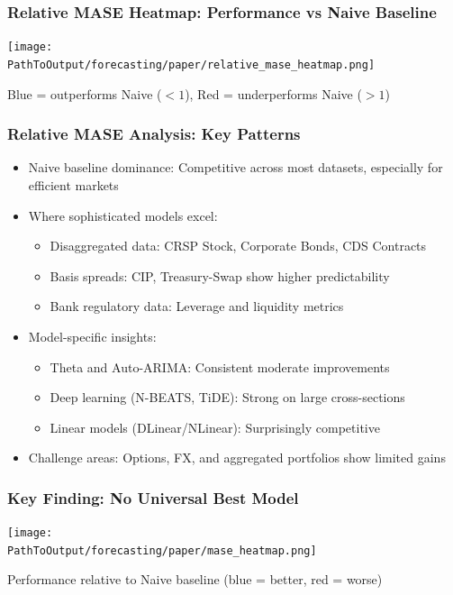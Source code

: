 \documentclass[ignorenonframetext, 9pt]{beamer}
\begin{document}
\begin{frame}
  \frametitle{Relative MASE Heatmap: Performance vs Naive Baseline}
  \centering
  \texttt{[image: \\PathToOutput/forecasting/paper/relative\_mase\_heatmap.png]}
  \vspace{0.2cm}

  Blue = outperforms Naive ($<1$), Red = underperforms Naive ($>1$)
\end{frame}

\begin{frame}
  \frametitle{Relative MASE Analysis: Key Patterns}
  \begin{itemize}
  \item \alert{Naive baseline dominance:} Competitive across most datasets, especially for efficient markets
  \vspace{0.3cm}
  \item \alert{Where sophisticated models excel:}
  \begin{itemize}
    \item Disaggregated data: CRSP Stock, Corporate Bonds, CDS Contracts
    \item Basis spreads: CIP, Treasury-Swap show higher predictability
    \item Bank regulatory data: Leverage and liquidity metrics
  \end{itemize}
  \vspace{0.3cm}
  \item \alert{Model-specific insights:}
  \begin{itemize}
    \item Theta and Auto-ARIMA: Consistent moderate improvements
    \item Deep learning (N-BEATS, TiDE): Strong on large cross-sections
    \item Linear models (DLinear/NLinear): Surprisingly competitive
  \end{itemize}
  \vspace{0.3cm}
  \item \alert{Challenge areas:} Options, FX, and aggregated portfolios show limited gains
  \end{itemize}
\end{frame}

\begin{frame}
  \frametitle{Key Finding: No Universal Best Model}
  \centering
  \texttt{[image: \\PathToOutput/forecasting/paper/mase\_heatmap.png]}
  \vspace{0.2cm}

  Performance relative to Naive baseline (blue = better, red = worse)
\end{frame}
\end{document}
